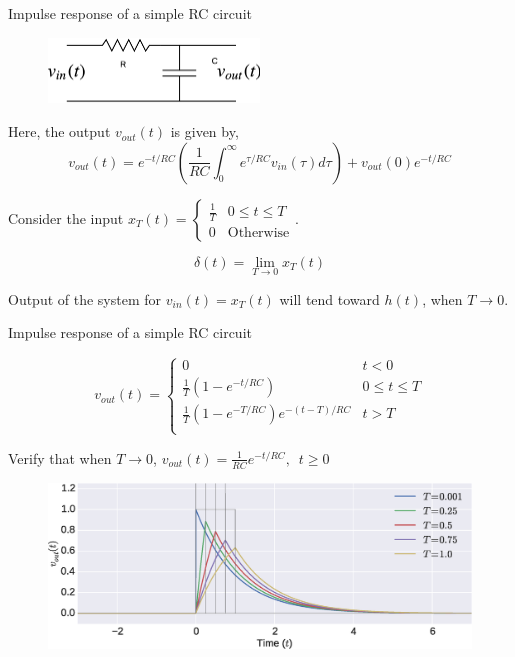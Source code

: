 \documentclass{beamer}
\begin{document}
\begin{frame}{Impulse response of a simple RC circuit}

\begin{figure}
\includegraphics[width=0.5\textwidth]{img/simple_rc.png}
\end{figure}

Here, the output $v_{out}(t)$ is given by,
\[ v_{out}(t) = e^{-t/RC} \left(\frac{1}{RC}\int_{0}^{\infty} {e^{\tau / RC}{v_{in}\left(\tau\right)}}d\tau\right) + v_{out}\left(0\right)e^{-t/RC} \]

Consider the input $x_T(t) = \begin{cases} \frac{1}{T} & 0 \leq t \leq T\\ 0 & \text{Otherwise} \end{cases}$.

\[ \delta(t) = \lim_{T \to 0} x_T(t) \]

Output of the system for $v_{in}(t) = x_T(t)$ will tend toward $h(t)$, when $T \to 0$.

\end{frame}

\begin{frame}{Impulse response of a simple RC circuit}

\[ v_{out}(t) = \begin{cases}
0 & t < 0\\
\frac{1}{T}\left(1 - e^{-t/RC}\right) & 0 \leq t \leq T \\
\frac{1}{T}\left(1 - e^{-T/RC}\right)e^{-(t-T)/RC} & t > T \\
\end{cases} \]

Verify that when $T \to 0$, $v_{out}(t) = \frac{1}{RC}e^{-t/RC}, \,\,\, t \geq 0$

\begin{figure}
\includegraphics[width=\textwidth]{img/simple_rc.eps}
\end{figure}
\end{frame}
\end{document}
